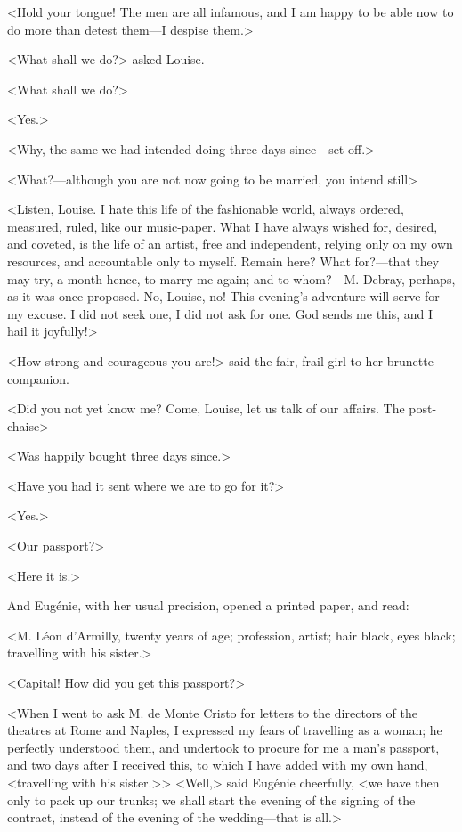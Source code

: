  <Hold your tongue! The men are all infamous, and I am happy to be able now to do more than detest them—I despise them.> 

 <What shall we do?> asked Louise. 

 <What shall we do?> 

 <Yes.> 

 <Why, the same we had intended doing three days since—set off.> 

 <What?—although you are not now going to be married, you intend still\longdash> 

 <Listen, Louise. I hate this life of the fashionable world, always ordered, measured, ruled, like our music-paper. What I have always wished for, desired, and coveted, is the life of an artist, free and independent, relying only on my own resources, and accountable only to myself. Remain here? What for?—that they may try, a month hence, to marry me again; and to whom?—M. Debray, perhaps, as it was once proposed. No, Louise, no! This evening's adventure will serve for my excuse. I did not seek one, I did not ask for one. God sends me this, and I hail it joyfully!> 

 <How strong and courageous you are!> said the fair, frail girl to her brunette companion. 

 <Did you not yet know me? Come, Louise, let us talk of our affairs. The post-chaise\longdash> 

 <Was happily bought three days since.> 

 <Have you had it sent where we are to go for it?> 

 <Yes.> 

 <Our passport?> 

 <Here it is.> 

 And Eugénie, with her usual precision, opened a printed paper, and read: 

 <M. Léon d'Armilly, twenty years of age; profession, artist; hair black, eyes black; travelling with his sister.> 

 <Capital! How did you get this passport?> 

 <When I went to ask M. de Monte Cristo for letters to the directors of the theatres at Rome and Naples, I expressed my fears of travelling as a woman; he perfectly understood them, and undertook to procure for me a man's passport, and two days after I received this, to which I have added with my own hand, <travelling with his sister.>>  <Well,> said Eugénie cheerfully, <we have then only to pack up our trunks; we shall start the evening of the signing of the contract, instead of the evening of the wedding—that is all.> 

